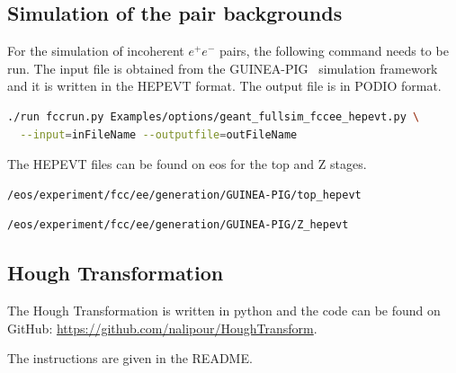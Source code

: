 \subsection{Simulation of the pair backgrounds}
For the simulation of incoherent $e^+e^-$ pairs, the following command needs to be run. The input file is obtained from the \textsc{GUINEA-PIG}~\cite{Schulte:382453} simulation framework and it is written in the \textsc{HEPEVT} format. The output file is in \textsc{PODIO} format.

\begin{lstlisting}[language=bash,caption={Simulation of the incoherent pair background.}]
  ./run fccrun.py Examples/options/geant_fullsim_fccee_hepevt.py \
  --input=inFileName --outputfile=outFileName
\end{lstlisting}


The \textsc{HEPEVT} files can be found on eos for the top and Z stages.
\begin{lstlisting}[language=bash,caption={Location of the background hits for the top stage.}]
  /eos/experiment/fcc/ee/generation/GUINEA-PIG/top_hepevt
\end{lstlisting}

\begin{lstlisting}[language=bash,caption={Location of the background hits for the Z stage.}]
  /eos/experiment/fcc/ee/generation/GUINEA-PIG/Z_hepevt
\end{lstlisting}


\subsection{Hough Transformation}

The Hough Transformation is written in python and the code can be found on GitHub: \href{https://github.com/nalipour/HoughTransform}{https://github.com/nalipour/HoughTransform}.


The instructions are given in the README.
